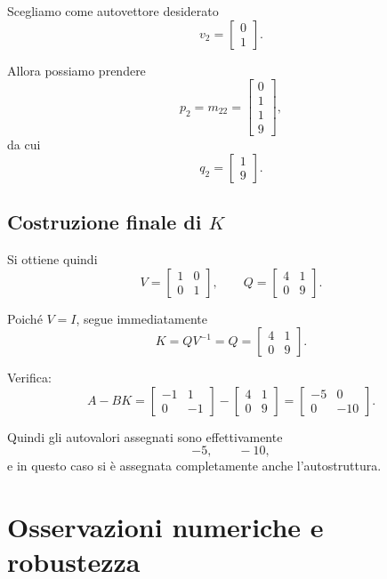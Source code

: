 Scegliamo come autovettore desiderato
\[
v_2=
\begin{bmatrix}
0\\1
\end{bmatrix}.
\]

Allora possiamo prendere
\[
p_2=m_{22}=
\begin{bmatrix}
0\\1\\1\\9
\end{bmatrix},
\]
da cui
\[
q_2=
\begin{bmatrix}
1\\9
\end{bmatrix}.
\]

\subsection{Costruzione finale di \(K\)}

Si ottiene quindi
\[
V=
\begin{bmatrix}
1 & 0\\
0 & 1
\end{bmatrix},
\qquad
Q=
\begin{bmatrix}
4 & 1\\
0 & 9
\end{bmatrix}.
\]

Poiché \(V=I\), segue immediatamente
\[
K=QV^{-1}=Q=
\begin{bmatrix}
4 & 1\\
0 & 9
\end{bmatrix}.
\]

Verifica:
\[
A-BK=
\begin{bmatrix}
-1 & 1\\
0 & -1
\end{bmatrix}
-
\begin{bmatrix}
4 & 1\\
0 & 9
\end{bmatrix}
=
\begin{bmatrix}
-5 & 0\\
0 & -10
\end{bmatrix}.
\]

Quindi gli autovalori assegnati sono effettivamente
\[
-5,\qquad -10,
\]
e in questo caso si è assegnata completamente anche l'autostruttura.

\section{Osservazioni numeriche e robustezza}

